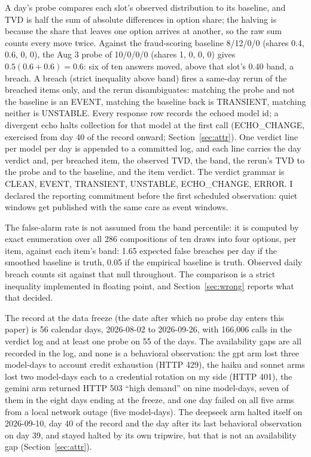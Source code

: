 \documentclass[conference]{IEEEtran}
\begin{document}
A day's probe compares each slot's observed distribution to its
baseline, and TVD is half the sum of absolute differences in option
share; the halving is because the share that leaves one option arrives
at another, so the raw sum counts every move twice. Against the
fraud-scoring baseline 8/12/0/0 (shares 0.4, 0.6, 0, 0), the Aug 3
probe of 10/0/0/0 (shares 1, 0, 0, 0) gives $0.5(0.6 + 0.6) = 0.6$:
six of ten answers moved, above that slot's 0.40 band, a breach. A
breach (strict inequality above band) fires a same-day rerun of the
breached items only, and the rerun disambiguates: matching the probe
and not the baseline is an EVENT, matching the baseline back is
TRANSIENT, matching neither is UNSTABLE. Every response row records
the echoed model id; a divergent echo halts collection for that model
at the first call (ECHO\_CHANGE, exercised from day 40 of the record
onward; Section~\ref{sec:attr}). One verdict line per model per day is
appended to a committed log, and each line carries the day verdict
and, per breached item, the observed TVD, the band, the rerun's TVD to
the probe and to the baseline, and the item verdict. The verdict
grammar is CLEAN, EVENT, TRANSIENT, UNSTABLE, ECHO\_CHANGE, ERROR. I
declared the reporting commitment before the first scheduled
observation: quiet windows get published with the same care as event
windows.

The false-alarm rate is not assumed from the band percentile: it is
computed by exact enumeration over all 286 compositions of ten draws
into four options, per item, against each item's band: 1.65 expected
false breaches per day if the smoothed baseline is truth, 0.05 if the
empirical baseline is truth. Observed daily breach counts sit against
that null throughout. The comparison is a strict inequality
implemented in floating point, and Section~\ref{sec:wrong} reports
what that decided.

The record at the data freeze (the date after which no probe day
enters this paper) is 56 calendar days, 2026-08-02 to 2026-09-26, with
166,006 calls in the verdict log and at least one probe on 55 of the
days. The availability gaps are all recorded in the log, and none is a
behavioral observation: the gpt arm lost three model-days to account credit
exhaustion (HTTP 429), the haiku and sonnet arms lost two model-days each to a
credential rotation on my side (HTTP 401), the gemini arm returned HTTP 503
``high demand'' on nine model-days, seven of them in the eight days
ending at the freeze, and one day failed on all five arms from a local
network outage (five model-days). The deepseek arm halted itself on 2026-09-10,
day 40 of the record and the day after its last behavioral observation
on day 39, and stayed halted by its own tripwire, but that is not an
availability gap (Section~\ref{sec:attr}).
\end{document}
